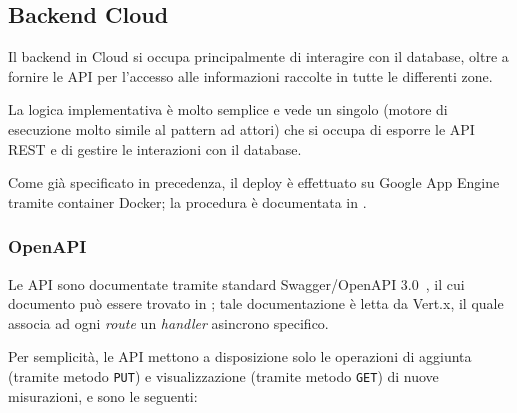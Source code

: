 \subsection{Backend Cloud}\label{subsec:cloud}

Il backend in Cloud si occupa principalmente di interagire con il database, oltre a fornire le API per l'accesso alle informazioni raccolte in tutte le differenti zone.

La logica implementativa è molto semplice e vede un singolo  (motore di esecuzione molto simile al pattern ad attori) che si occupa di esporre le API REST e di gestire le interazioni con il database.

Come già specificato in precedenza, il deploy è effettuato su Google App Engine tramite container Docker;
la procedura è documentata in .

\subsubsection{OpenAPI}\label{subsub:openapi}

Le API sono documentate tramite standard Swagger/OpenAPI 3.0~\cite{OpenAPIInitiative2018}, il cui documento può essere trovato in ;
tale documentazione è letta da Vert.x, il quale associa ad ogni \emph{route} un \emph{handler} asincrono specifico.

Per semplicità, le API mettono a disposizione solo le operazioni di aggiunta (tramite metodo \texttt{PUT}) e visualizzazione (tramite metodo \texttt{GET}) di nuove misurazioni, e sono le seguenti:


